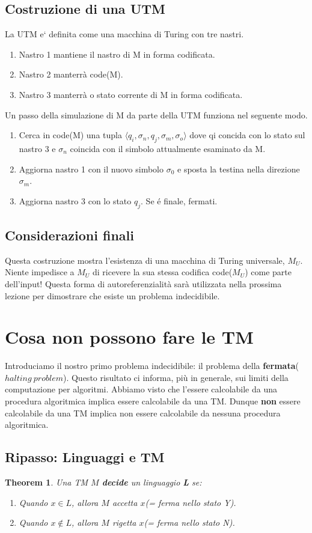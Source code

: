 \documentclass[a4paper, 12pt]{article}
\newtheorem{theorem}{Theorem}[section]
\begin{document}
\subsection{Costruzione di una UTM}
La UTM e` definita come una macchina di Turing con tre nastri. 
\begin{enumerate}
\item Nastro 1 mantiene il nastro di M in forma codificata.
\item Nastro 2 manterr\`a code(M).
\item Nastro 3 manterr\`a o stato corrente di M in forma codificata.
\end{enumerate}
Un passo della simulazione di  M da parte della UTM funziona nel seguente modo.
\begin{enumerate}
\item Cerca in code(M) una tupla $⟨ q_i, \sigma_n, q_j, \sigma_m, \sigma_o ⟩$ dove qi concida con lo stato sul nastro 3 e $\sigma_n$ coincida con il simbolo attualmente esaminato da M.
\item Aggiorna nastro 1 con il nuovo simbolo $\sigma_0$ e sposta la testina nella direzione $\sigma_m$.
\item Aggiorna nastro 3 con lo stato $q_j$. Se é finale, fermati.
\end{enumerate}
\subsection{Considerazioni finali}
Questa costruzione mostra l'esistenza di una macchina di Turing universale, $M_U$. Niente impedisce a $M_U$ di ricevere la sua stessa codifica code($M_U$) come parte dell'input! Questa forma di autoreferenzialit\`a sar\`a utilizzata nella prossima lezione per dimostrare che esiste un problema indecidibile.
\newpage
\section{Cosa non possono fare le TM}
Introduciamo il nostro primo problema indecidibile: il problema della \textbf{fermata}($halting\ problem$). Questo risultato ci informa, pi\`u in generale, sui limiti della computazione per algoritmi. Abbiamo visto che l'essere calcolabile da una procedura algoritmica implica essere calcolabile da una TM. Dunque \textbf{non} essere calcolabile da una TM implica non essere calcolabile da nessuna procedura algoritmica.
\subsection{Ripasso: Linguaggi e TM}
\begin{theorem}
Una TM $M$ \textbf{decide} un linguaggio \textbf{L} se:
\begin{enumerate}
\item Quando $x \in L$, allora $M$ accetta $x$(= ferma nello stato Y).
\item Quando $x \notin L$, allora $M$ rigetta $x$(= ferma nello stato N).
\end{enumerate}
\end{theorem}
\end{document}
